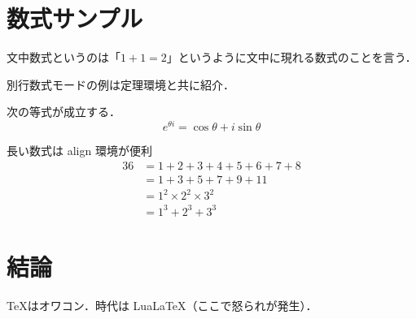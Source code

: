 \documentclass[lualatex,book,paper=b5,jafontsize=12pt]{jlreq}
\begin{document}
\section{数式サンプル}

文中数式というのは「$1+1=2$」というように文中に現れる数式のことを言う．

別行数式モードの例は定理環境と共に紹介．

\begin{theorem}[オイラーの公式]
次の等式が成立する．
\[
 e^{\theta i}=\cos \theta + i\sin \theta
\]
\end{theorem}

長い数式は align 環境が便利
\begin{align*}
 36 &= 1 + 2 + 3 + 4 + 5 + 6 + 7 + 8 \\
 &= 1 + 3 + 5 + 7 + 9 + 11 \\ 
 &= 1^{2}\times 2^{2} \times 3^{2}\\
 &= 1^{3} + 2^{3} + 3^{3}
\end{align*}

\section{結論}
\TeX はオワコン．時代は Lua\LaTeX（ここで怒られが発生）．
\end{document}
